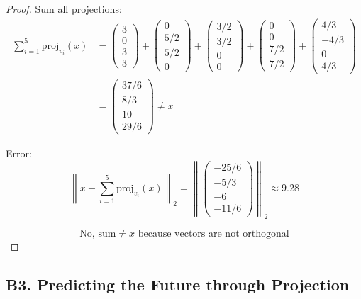 \documentclass[12pt]{article}
\theoremstyle{definition}
\begin{document}
\begin{proof}
Sum all projections:
\begin{align*}
\sum_{i=1}^5 \text{proj}_{v_i}(x) &= \begin{pmatrix} 3 \\ 0 \\ 3 \\ 3 \end{pmatrix} + \begin{pmatrix} 0 \\ 5/2 \\ 5/2 \\ 0 \end{pmatrix} + \begin{pmatrix} 3/2 \\ 3/2 \\ 0 \\ 0 \end{pmatrix} + \begin{pmatrix} 0 \\ 0 \\ 7/2 \\ 7/2 \end{pmatrix} + \begin{pmatrix} 4/3 \\ -4/3 \\ 0 \\ 4/3 \end{pmatrix} \\
&= \begin{pmatrix} 37/6 \\ 8/3 \\ 10 \\ 29/6 \end{pmatrix} \neq x
\end{align*}

Error:
\[
\left\|x - \sum_{i=1}^5 \text{proj}_{v_i}(x)\right\|_2 = \left\|\begin{pmatrix} -25/6 \\ -5/3 \\ -6 \\ -11/6 \end{pmatrix}\right\|_2 \approx 9.28
\]

\[
\boxed{\text{No, sum} \neq x \text{ because vectors are not orthogonal}}
\]
\end{proof}

\newpage
\subsection*{B3. Predicting the Future through Projection}
\end{document}
